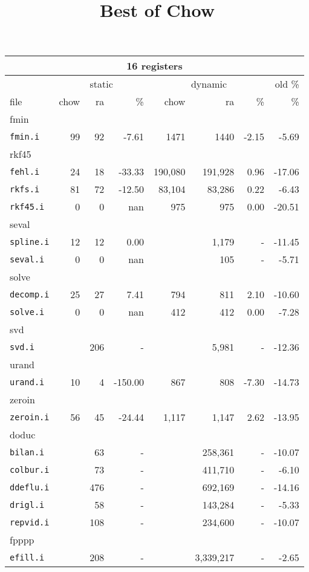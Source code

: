 \documentclass[11pt]{article}
\title{Best of Chow}
\begin{document}
\begin{tabular}{|l|r|r|r|r|r|r|r|}
\hline
\multicolumn{8}{|c|}{16 registers}\\
\hline
&\multicolumn{3}{c}{static}&\multicolumn{3}{|c|}{dynamic}&old \%\\
\hline
file&chow&ra&\%&chow&ra&\%&\%\\
\hline



%
%
\multicolumn{8}{|l|}{fmin}\\
\hline
\texttt{fmin.i}&99&92&-7.61&1471&1440&-2.15&-5.69 \\
\hline
%
%
\multicolumn{8}{|l|}{rkf45}\\
\hline
\texttt{fehl.i}&24&18&-33.33&190,080&191,928&0.96&-17.06 \\
\hline
\texttt{rkfs.i}&81&72&-12.50&83,104&83,286&0.22&-6.43 \\
\hline
\texttt{rkf45.i}&0&0&nan&975&975&0.00&-20.51 \\
\hline
%
%
\multicolumn{8}{|l|}{seval}\\
\hline
\texttt{spline.i}&12&12&0.00&&1,179&-&-11.45 \\
\hline
\texttt{seval.i}&0&0&nan&&105&-&-5.71 \\
\hline
%
%
\multicolumn{8}{|l|}{solve}\\
\hline
\texttt{decomp.i}&25&27&7.41&794&811&2.10&-10.60 \\
\hline
\texttt{solve.i}&0&0&nan&412&412&0.00&-7.28 \\
\hline
%
%
\multicolumn{8}{|l|}{svd}\\
\hline
\texttt{svd.i}&&206&-&&5,981&-&-12.36 \\
\hline
%
%
\multicolumn{8}{|l|}{urand}\\
\hline
\texttt{urand.i}&10&4&-150.00&867&808&-7.30&-14.73 \\
\hline
%
%
\multicolumn{8}{|l|}{zeroin}\\
\hline
\texttt{zeroin.i}&56&45&-24.44&1,117&1,147&2.62&-13.95 \\
\hline
%
%
\multicolumn{8}{|l|}{doduc}\\
\hline
\texttt{bilan.i}&&63&-&&258,361&-&-10.07 \\
\hline
\texttt{colbur.i}&&73&-&&411,710&-&-6.10 \\
\hline
\texttt{ddeflu.i}&&476&-&&692,169&-&-14.16 \\
\hline
\texttt{drigl.i}&&58&-&&143,284&-&-5.33 \\
\hline
\texttt{repvid.i}&&108&-&&234,600&-&-10.07 \\
\hline
%
%
\multicolumn{8}{|l|}{fpppp}\\
\hline
\texttt{efill.i}&&208&-&&3,339,217&-&-2.65 \\
\hline

\end{tabular}
\end{document}
